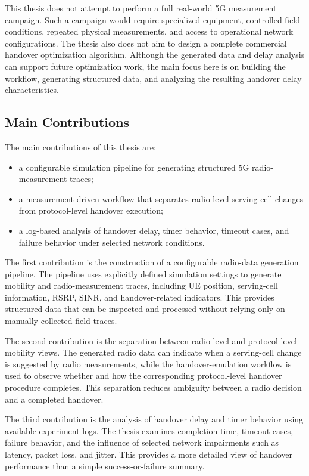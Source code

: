 This thesis does not attempt to perform a full real-world 5G measurement campaign. Such a campaign would require specialized equipment, controlled field conditions, repeated physical measurements, and access to operational network configurations. The thesis also does not aim to design a complete commercial handover optimization algorithm. Although the generated data and delay analysis can support future optimization work, the main focus here is on building the workflow, generating structured data, and analyzing the resulting handover delay characteristics.

\subsection{Main Contributions}

The main contributions of this thesis are:

\begin{itemize}
    \item a configurable simulation pipeline for generating structured 5G radio-measurement traces;
    \item a measurement-driven workflow that separates radio-level serving-cell changes from protocol-level handover execution;
    \item a log-based analysis of handover delay, timer behavior, timeout cases, and failure behavior under selected network conditions.
\end{itemize}

The first contribution is the construction of a configurable radio-data generation pipeline. The pipeline uses explicitly defined simulation settings to generate mobility and radio-measurement traces, including UE position, serving-cell information, RSRP, SINR, and handover-related indicators. This provides structured data that can be inspected and processed without relying only on manually collected field traces.

The second contribution is the separation between radio-level and protocol-level mobility views. The generated radio data can indicate when a serving-cell change is suggested by radio measurements, while the handover-emulation workflow is used to observe whether and how the corresponding protocol-level handover procedure completes. This separation reduces ambiguity between a radio decision and a completed handover.

The third contribution is the analysis of handover delay and timer behavior using available experiment logs. The thesis examines completion time, timeout cases, failure behavior, and the influence of selected network impairments such as latency, packet loss, and jitter. This provides a more detailed view of handover performance than a simple success-or-failure summary.

